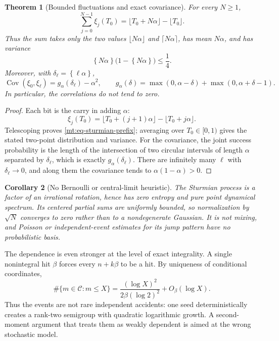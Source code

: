 \documentclass[11pt,oneside]{article}
\newtheorem{theorem}{Theorem}[section]
\newtheorem{corollary}[theorem]{Corollary}
\theoremstyle{definition}
\theoremstyle{remark}
\newcommand{\Cand}{\mathcal C}
\newcommand{\fract}[1]{\left\{#1\right\}}
\begin{document}
\begin{theorem}[Bounded fluctuations and exact covariance]
\label{mt:thm-sturmian-probability}
For every $N\ge1$,
\begin{equation}
 \sum_{j=0}^{N-1}\xi_j(T_0)
 =\lfloor T_0+N\alpha\rfloor-\lfloor T_0\rfloor.
 \label{mt:eq-sturmian-prefix}
\end{equation}
Thus the sum takes only the two values $\lfloor N\alpha\rfloor$ and
$\lceil N\alpha\rceil$, has mean $N\alpha$, and has variance
\begin{equation}
 \fract{N\alpha}\bigl(1-\fract{N\alpha}\bigr)\le\frac14.
 \label{mt:eq-sturmian-variance}
\end{equation}
Moreover, with $\delta_\ell=\fract{\ell\alpha}$,
\begin{equation}
 \operatorname{Cov}(\xi_0,\xi_\ell)
 =g_\alpha(\delta_\ell)-\alpha^2,
 \qquad
 g_\alpha(\delta)=
 \max(0,\alpha-\delta)+\max(0,\alpha+\delta-1).
 \label{mt:eq-sturmian-covariance}
\end{equation}
In particular, the correlations do not tend to zero.
\end{theorem}

\begin{proof}
Each bit is the carry in adding $\alpha$:
\[
 \xi_j(T_0)=
 \lfloor T_0+(j+1)\alpha\rfloor-
 \lfloor T_0+j\alpha\rfloor.
\]
Telescoping proves \eqref{mt:eq-sturmian-prefix}; averaging over $T_0\in[0,1)$ gives the stated
two-point distribution and variance.  For the covariance, the joint success probability is
the length of the intersection of two circular intervals of length $\alpha$ separated by
$\delta_\ell$, which is exactly $g_\alpha(\delta_\ell)$.  There are infinitely many $\ell$
with $\delta_\ell\to0$, and along them the covariance tends to
$\alpha(1-\alpha)>0$.
\end{proof}

\begin{corollary}[No Bernoulli or central-limit heuristic]
\label{mt:cor-no-bernoulli}
The Sturmian process is a factor of an irrational rotation, hence has zero entropy and pure
point dynamical spectrum.  Its centered partial sums are uniformly bounded, so normalization
by $\sqrt N$ converges to zero rather than to a nondegenerate Gaussian.  It is not mixing, and
Poisson or independent-event estimates for its jump pattern have no probabilistic basis.
\end{corollary}

The dependence is even stronger at the level of exact integrality.  A single nonintegral hit
$\beta$ forces every $n+k\beta$ to be a hit.  By uniqueness of conditional coordinates,
\begin{equation}
 \#\{m\in\Cand:m\le X\}
 =\frac{(\log X)^2}{2\beta(\log2)^2}+O_\beta(\log X).
 \label{mt:eq-candidate-log-count}
\end{equation}
Thus the events are not rare independent accidents: one seed deterministically creates a
rank-two semigroup with quadratic logarithmic growth.  A second-moment argument that treats
them as weakly dependent is aimed at the wrong stochastic model.
\end{document}
